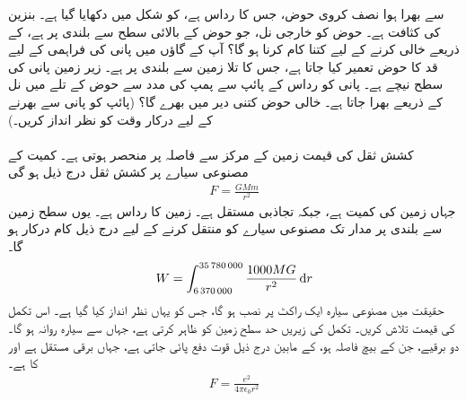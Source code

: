   سے بھرا ہوا  نصف کروی حوض، جس کا رداس  ہے، کو شکل  میں دکھایا گیا ہے۔  بنزین کی کثافت  ہے۔ حوض کو خارجی نل، جو حوض کے بالائی سطح سے  بلندی پر ہے، کے ذریعے خالی کرنے کے لیے کتنا کام کرنا ہو گا؟
آپ کے گاؤں میں پانی کی فراہمی کے لیے   قد کا   حوض تعمیر کیا جاتا ہے، جس کا تلا زمین سے  بلندی پر ہے۔ زیر زمین پانی کی سطح  نیچے ہے۔ پانی کو  رداس کے پائپ سے  پمپ کی مدد سے  حوض کے  تلے میں نل کے ذریعے بھرا جاتا ہے۔ خالی حوض کتنی دیر میں بھرے گا؟ (پائپ کو پانی سے بھرنے کے لیے درکار وقت کو نظر انداز کریں۔) 
\\
\\
کشش ثقل کی قیمت زمین کے مرکز سے فاصلہ  پر منحصر ہوتی ہے۔ کمیت  کے مصنوعی سیارے پر کشش ثقل درج ذیل ہو گی
\begin{align*}
F=\frac{GMm}{r^2}
\end{align*} 
جہاں زمین کی کمیت  ہے،  جبکہ تجاذبی مستقل  ہے۔ زمین کا رداس  ہے۔ یوں سطح  زمین   سے   بلندی پر مدار تک  مصنوعی سیارے کو منتقل کرنے کے لیے درج ذیل  کام درکار ہو گا۔
\begin{align*}
W=\int_{\num{6370000}}^{\num{35780000}}\frac{1000MG}{r^2}\dif r
\end{align*}
حقیقت میں مصنوعی سیارہ ایک راکٹ پر نصب ہو گا، جس کو یہاں نظر انداز کیا گیا ہے۔ اس تکمل کی قیمت تلاش کریں۔ تکمل کی  زیریں حد سطح زمین کو ظاہر کرتی ہے، جہاں سے سیارہ روانہ ہو گا۔
دو  برقیے، جن کے بیچ فاصلہ  ہو، کے مابین درج ذیل قوت دفع پائی جاتی ہے،  جہاں  برقی مستقل ہے اور   کا  ہے۔
  \begin{align*}
F=\frac{e^2}{4\pi\epsilon_0 r^2}
\end{align*}
